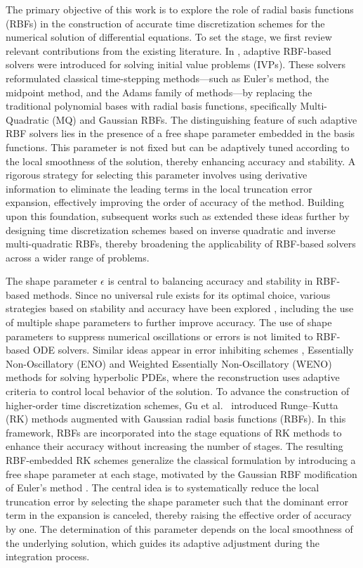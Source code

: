 \documentclass[a4paper, preprint,11pt]{elsarticle}
\numberwithin{equation}{section}
\begin{document}
The primary objective of this work is to explore the role of radial basis functions (RBFs) in the construction of accurate time discretization schemes for the numerical solution of differential equations. To set the stage, we first review relevant contributions from the existing literature. In \cite{Jung,Gu}, adaptive RBF-based solvers were introduced for solving initial value problems (IVPs). These solvers reformulated classical time-stepping methods—such as Euler’s method, the midpoint method, and the Adams family of methods—by replacing the traditional polynomial bases with radial basis functions, specifically Multi-Quadratic (MQ) and Gaussian RBFs. The distinguishing feature of such adaptive RBF solvers lies in the presence of a free shape parameter embedded in the basis functions. This parameter is not fixed but can be adaptively tuned according to the local smoothness of the solution, thereby enhancing accuracy and stability. A rigorous strategy for selecting this parameter involves using derivative information to eliminate the leading terms in the local truncation error expansion, effectively improving the order of accuracy of the method. Building upon this foundation, subsequent works such as \cite{Rathan, rathan2024adaptive} extended these ideas further by designing time discretization schemes based on inverse quadratic and inverse multi-quadratic RBFs, thereby broadening the applicability of RBF-based solvers across a wider range of problems. 

\par The shape parameter $\epsilon$ is central to balancing accuracy and stability in RBF-based methods. Since no universal rule exists for its optimal choice, various strategies based on stability and accuracy have been explored \cite{fasshauer2007choosing,fornberg2004some,schaback1995error}, including the use of multiple shape parameters to further improve accuracy. The use of shape parameters to suppress numerical oscillations or errors is not limited to RBF-based ODE solvers. Similar ideas appear in error inhibiting schemes \cite{gu2020adaptive}, Essentially Non-Oscillatory (ENO) and Weighted Essentially Non-Oscillatory (WENO) \cite{guo2017radial,guo2017rbf} methods for solving hyperbolic PDEs, where the reconstruction uses adaptive criteria to control local behavior of the solution. To advance the construction of higher-order time discretization schemes, Gu et al.~\cite{Jiaxi} introduced Runge–Kutta (RK) methods augmented with Gaussian radial basis functions (RBFs). In this framework, RBFs are incorporated into the stage equations of RK methods to enhance their accuracy without increasing the number of stages. The resulting RBF-embedded RK schemes generalize the classical formulation by introducing a free shape parameter at each stage, motivated by the Gaussian RBF modification of Euler’s method \cite{Gu}. The central idea is to systematically reduce the local truncation error by selecting the shape parameter such that the dominant error term in the expansion is canceled, thereby raising the effective order of accuracy by one. The determination of this parameter depends on the local smoothness of the underlying solution, which guides its adaptive adjustment during the integration process. 
\end{document}
